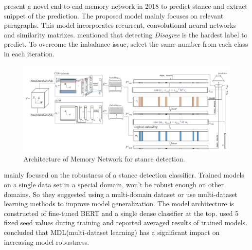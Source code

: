 \cite{memory_network} present a novel end-to-end memory network in 2018 to predict stance and extract snippet of the prediction. The proposed model mainly focuses on relevant paragraphs. This model incorporates recurrent, convolutional neural networks and similarity matrixes. \cite{memory_network} mentioned that detecting \textit{Disagree} is the hardest label to predict. To overcome the imbalance issue, \cite{memory_network} select the same number from each class in each iteration. 
\begin{figure}
	\centering
	\includegraphics[scale=0.25]{statistics/stance/memoty_network.png}
	\caption{Architecture of Memory Network for stance detection.}
	\label{fig:mem_network}
\end{figure}

\cite{stance_robust} mainly focused on the robustness of a stance detection classifier. Trained models  on a single data set in a special domain, won't be robust enough on other domains. So they suggested using a multi-domain dataset or use multi-dataset learning methods to improve model generalization. The model architecture is constructed of fine-tuned BERT\cite{bert} and a single dense classifier at the top. \cite{stance_robust} used 5 fixed seed values during training and reported averaged results of trained models. \cite{stance_robust} concluded that MDL(multi-dataset learning) has a significant impact on increasing model robustness.
